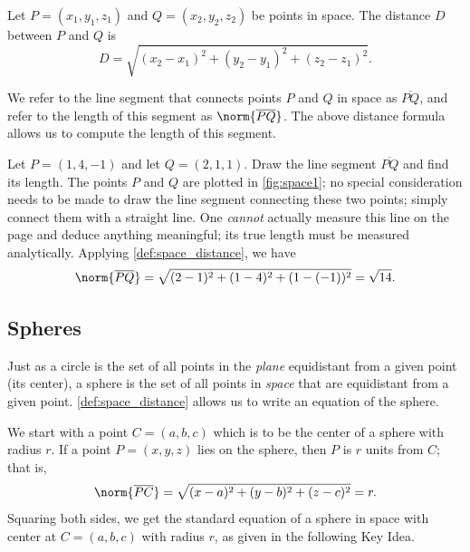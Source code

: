 \begin{definition}\label{def:space_distance}
Let $P=(x_1,y_1,z_1)$ and $Q = (x_2,y_2,z_2)$ be points in space. The distance $D$ between $P$ and $Q$ is 
\[D = \sqrt{(x_2-x_1)^2+(y_2-y_1)^2+(z_2-z_1)^2}.\]
\end{definition}

We refer to the line segment that connects points $P$ and $Q$ in space as $\overline{PQ}$, and refer to the length of this segment as $\norm{\overline{PQ}}$. The above distance formula allows us to compute the length of this segment.

\begin{example}\label{ex_space1}
Let $P = (1,4,-1)$ and let $Q = (2,1,1)$. Draw the line segment $\overline{PQ}$ and find its length.
\solution
The points $P$ and $Q$ are plotted in \autoref{fig:space1}; no special consideration needs to be made to draw the line segment connecting these two points; simply connect them with a straight line. One \emph{cannot} actually measure this line on the page and deduce anything meaningful; its true length must be measured analytically. Applying \autoref{def:space_distance}, we have
%
%
\[
\norm{\overline{PQ}}= \sqrt{(2-1)^2+(1-4)^2+(1-(-1))^2} = \sqrt{14}%
.
\]
\end{example}

\subsection{Spheres}

Just as a circle is the set of all points in the \emph{plane} equidistant from a given point (its center), a sphere is the set of all points in \emph{space} that are equidistant from a given point. \autoref{def:space_distance} allows us to write an equation of the sphere.

We start with a point $C = (a,b,c)$ which is to be the center of a sphere with radius $r$. If a point $P=(x,y,z)$ lies on the sphere, then $P$ is $r$ units from $C$; that is, 
\[\norm{\overline{PC}}= \sqrt{(x-a)^2+(y-b)^2+(z-c)^2} = r.\]
Squaring both sides, we get the standard equation of a sphere in space with center at $C=(a,b,c)$ with radius $r$, as given in the following Key Idea.

